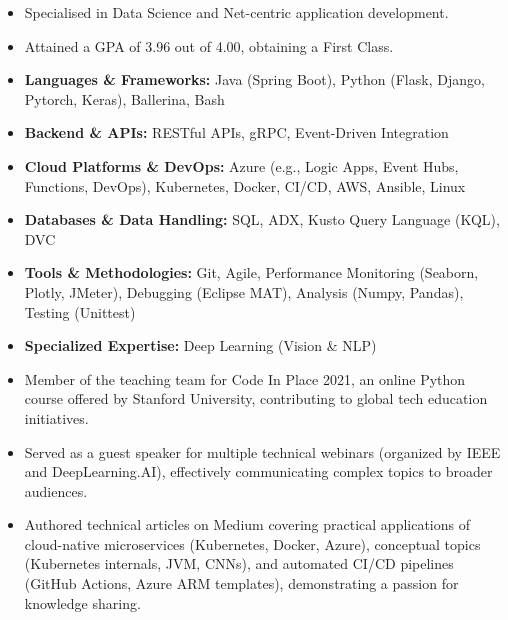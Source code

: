 \documentclass[12pt,a4paper,withhyper]{altacv}
\begin{document}
\divider{}

\begin{itemize}
    \item Specialised in Data Science and Net-centric application development.
    \item Attained a GPA of 3.96 out of 4.00, obtaining a First Class.
\end{itemize}

\medskip


\begin{itemize}
    \item \textbf{Languages \& Frameworks:} Java (Spring Boot), Python (Flask, Django, Pytorch, Keras), Ballerina, Bash
    \item \textbf{Backend \& APIs:} RESTful APIs, gRPC, Event-Driven Integration
    \item \textbf{Cloud Platforms \& DevOps:} Azure (e.g., Logic Apps, Event Hubs, Functions, DevOps), Kubernetes, Docker, CI/CD, AWS, Ansible, Linux
    \item \textbf{Databases \& Data Handling:} SQL, ADX, Kusto Query Language (KQL), DVC
    \item \textbf{Tools \& Methodologies:} Git, Agile, Performance Monitoring (Seaborn, Plotly, JMeter), Debugging (Eclipse MAT), Analysis (Numpy, Pandas), Testing (Unittest)
    \item \textbf{Specialized Expertise:} Deep Learning (Vision \& NLP)
\end{itemize}

\medskip

\begin{itemize}
    \item Member of the teaching team for Code In Place 2021, an online Python course offered by Stanford University, contributing to global tech education initiatives.
    \item Served as a guest speaker for multiple technical webinars (organized by IEEE and DeepLearning.AI), effectively communicating complex topics to broader audiences.
    \item  Authored technical articles on Medium covering practical applications of cloud-native microservices (Kubernetes, Docker, Azure), conceptual topics (Kubernetes internals, JVM, CNNs), and automated CI/CD pipelines (GitHub Actions, Azure ARM templates), demonstrating a passion for knowledge sharing.
\end{itemize}
\end{document}
